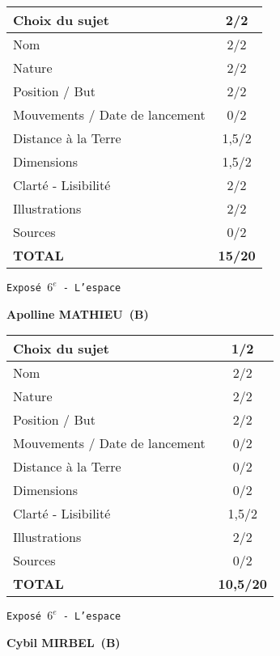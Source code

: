 	\vspace*{2cm}
	\begin{tabular}{|l|c|}
		\hline
		Choix du sujet & 2/2 \\
		\hline
		Nom & 2/2 \\
		\hline
		Nature & 2/2 \\
		\hline
		Position / But & 2/2 \\
		\hline
		Mouvements / Date de lancement & 0/2 \\
		\hline
		Distance \`a la Terre & 1,5/2 \\
		\hline
		Dimensions & 1,5/2 \\
		\hline
		Clart\'e - Lisibilit\'e & 2/2 \\
		\hline
		Illustrations & 2/2 \\
		\hline
		Sources & 0/2 \\
		\hline
		\textbf{TOTAL}  & \textbf{15/20} \\
		\hline
	\end{tabular}
	\newline
	\LARGE{\texttt{Expos\'e $6^e$ - L'espace}}
	\vspace*{1cm}

	\textbf{Apolline MATHIEU\ (B)}

	\vspace*{2cm}
	\begin{tabular}{|l|c|}
		\hline
		Choix du sujet & 1/2 \\
		\hline
		Nom & 2/2 \\
		\hline
		Nature & 2/2 \\
		\hline
		Position / But & 2/2 \\
		\hline
		Mouvements / Date de lancement & 0/2 \\
		\hline
		Distance \`a la Terre & 0/2 \\
		\hline
		Dimensions & 0/2 \\
		\hline
		Clart\'e - Lisibilit\'e & 1,5/2 \\
		\hline
		Illustrations & 2/2 \\
		\hline
		Sources & 0/2 \\
		\hline
		\textbf{TOTAL}  & \textbf{10,5/20} \\
		\hline
	\end{tabular}
	\newline
	\LARGE{\texttt{Expos\'e $6^e$ - L'espace}}
	\vspace*{1cm}

	\textbf{Cybil MIRBEL\ (B)}

